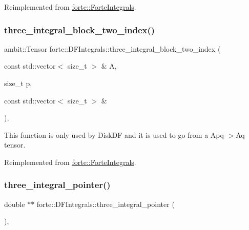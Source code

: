 Reimplemented from \mbox{\hyperlink{classforte_1_1_forte_integrals_aa1d259ae97b5a9c96ccb20599543b126}{forte\+::\+Forte\+Integrals}}.

\mbox{\label{classforte_1_1_d_f_integrals_a455cc314d177bbcd4c25cbca6b0f02be}} 
\subsubsection{\texorpdfstring{three\+\_\+integral\+\_\+block\+\_\+two\+\_\+index()}{three\_integral\_block\_two\_index()}}
{\footnotesize\ttfamily ambit\+::\+Tensor forte\+::\+D\+F\+Integrals\+::three\+\_\+integral\+\_\+block\+\_\+two\+\_\+index (\begin{DoxyParamCaption}\item[{const std\+::vector$<$ size\+\_\+t $>$ \&}]{A,  }\item[{size\+\_\+t}]{p,  }\item[{const std\+::vector$<$ size\+\_\+t $>$ \&}]{ }\end{DoxyParamCaption})\hspace{0.3cm}{\ttfamily [override]}, {\ttfamily [virtual]}}



This function is only used by Disk\+DF and it is used to go from a Apq-\/$>$Aq tensor. 



Reimplemented from \mbox{\hyperlink{classforte_1_1_forte_integrals_aab51824020dc3588c026b5b7740f55a9}{forte\+::\+Forte\+Integrals}}.

\mbox{\label{classforte_1_1_d_f_integrals_ad682d1f719de96683aa2bc02fc46eabe}} 
\subsubsection{\texorpdfstring{three\+\_\+integral\+\_\+pointer()}{three\_integral\_pointer()}}
{\footnotesize\ttfamily double $\ast$$\ast$ forte\+::\+D\+F\+Integrals\+::three\+\_\+integral\+\_\+pointer (\begin{DoxyParamCaption}{ }\end{DoxyParamCaption})\hspace{0.3cm}{\ttfamily [override]}, {\ttfamily [virtual]}}




